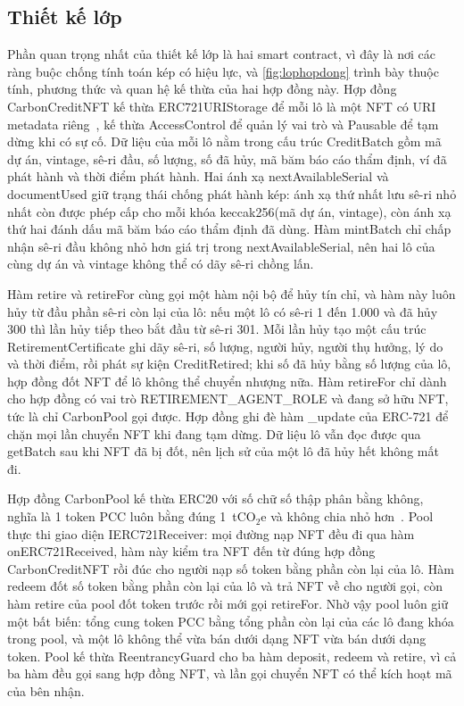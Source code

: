 \HinhMockTraCuu

\subsection*{Thiết kế lớp}
\label{subsec:tk-lop}
\label{sec:tk-hopdong}

Phần quan trọng nhất của thiết kế lớp là hai smart contract, vì đây là nơi các ràng buộc chống tính toán kép có hiệu lực, và \autoref{fig:lophopdong} trình bày thuộc tính, phương thức và quan hệ kế thừa của hai hợp đồng này. Hợp đồng CarbonCreditNFT kế thừa ERC721URIStorage để mỗi lô là một NFT có URI metadata riêng~\cite{eip721}, kế thừa AccessControl để quản lý vai trò và Pausable để tạm dừng khi có sự cố. Dữ liệu của mỗi lô nằm trong cấu trúc CreditBatch gồm mã dự án, vintage, sê-ri đầu, số lượng, số đã hủy, mã băm báo cáo thẩm định, ví đã phát hành và thời điểm phát hành. Hai ánh xạ nextAvailableSerial và documentUsed giữ trạng thái chống phát hành kép: ánh xạ thứ nhất lưu sê-ri nhỏ nhất còn được phép cấp cho mỗi khóa keccak256(mã dự án, vintage), còn ánh xạ thứ hai đánh dấu mã băm báo cáo thẩm định đã dùng. Hàm mintBatch chỉ chấp nhận sê-ri đầu không nhỏ hơn giá trị trong nextAvailableSerial, nên hai lô của cùng dự án và vintage không thể có dãy sê-ri chồng lấn.

Hàm retire và retireFor cùng gọi một hàm nội bộ để hủy tín chỉ, và hàm này luôn hủy từ đầu phần sê-ri còn lại của lô: nếu một lô có sê-ri 1 đến 1.000 và đã hủy 300 thì lần hủy tiếp theo bắt đầu từ sê-ri 301. Mỗi lần hủy tạo một cấu trúc RetirementCertificate ghi dãy sê-ri, số lượng, người hủy, người thụ hưởng, lý do và thời điểm, rồi phát sự kiện CreditRetired; khi số đã hủy bằng số lượng của lô, hợp đồng đốt NFT để lô không thể chuyển nhượng nữa. Hàm retireFor chỉ dành cho hợp đồng có vai trò RETIREMENT\_AGENT\_ROLE và đang sở hữu NFT, tức là chỉ CarbonPool gọi được. Hợp đồng ghi đè hàm \_update của ERC-721 để chặn mọi lần chuyển NFT khi đang tạm dừng. Dữ liệu lô vẫn đọc được qua getBatch sau khi NFT đã bị đốt, nên lịch sử của một lô đã hủy hết không mất đi.

Hợp đồng CarbonPool kế thừa ERC20 với số chữ số thập phân bằng không, nghĩa là 1 token PCC luôn bằng đúng 1~tCO$_2$e và không chia nhỏ hơn~\cite{eip20}. Pool thực thi giao diện IERC721Receiver: mọi đường nạp NFT đều đi qua hàm onERC721Received, hàm này kiểm tra NFT đến từ đúng hợp đồng CarbonCreditNFT rồi đúc cho người nạp số token bằng phần còn lại của lô. Hàm redeem đốt số token bằng phần còn lại của lô và trả NFT về cho người gọi, còn hàm retire của pool đốt token trước rồi mới gọi retireFor. Nhờ vậy pool luôn giữ một bất biến: tổng cung token PCC bằng tổng phần còn lại của các lô đang khóa trong pool, và một lô không thể vừa bán dưới dạng NFT vừa bán dưới dạng token. Pool kế thừa ReentrancyGuard cho ba hàm deposit, redeem và retire, vì cả ba hàm đều gọi sang hợp đồng NFT, và lần gọi chuyển NFT có thể kích hoạt mã của bên nhận.


